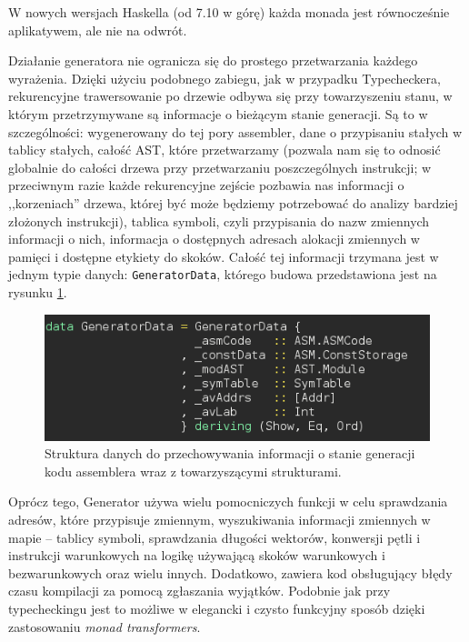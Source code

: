 W nowych wersjach Haskella (od 7.10 w górę) każda monada jest równocześnie aplikatywem, ale nie na odwrót.

Działanie generatora nie ogranicza się do prostego przetwarzania każdego wyrażenia. Dzięki użyciu podobnego zabiegu, jak w przypadku Typecheckera, rekurencyjne trawersowanie po drzewie odbywa się przy towarzyszeniu stanu, w którym przetrzymywane są informacje o bieżącym stanie generacji. Są to w szczególności: wygenerowany do tej pory assembler, dane o przypisaniu stałych w tablicy stałych, całość AST, które przetwarzamy (pozwala nam się to odnosić globalnie do całości drzewa przy przetwarzaniu poszczególnych instrukcji; w przeciwnym razie każde rekurencyjne zejście pozbawia nas informacji o ,,korzeniach'' drzewa, której być może będziemy potrzebować do analizy bardziej złożonych instrukcji), tablica symboli, czyli przypisania do nazw zmiennych informacji o nich, informacja o dostępnych adresach alokacji zmiennych w pamięci i dostępne etykiety do skoków. Całość tej informacji trzymana jest w jednym typie danych: \texttt{GeneratorData}, którego budowa przedstawiona jest na rysunku \ref{fig:generator-data}.

\begin{figure}
  \begin{center}
    \includegraphics[scale=0.5]{images/generator-data.png}
    \caption{Struktura danych do przechowywania informacji o stanie generacji kodu assemblera wraz z towarzyszącymi strukturami.}
    \label{fig:generator-data}
  \end{center}
\end{figure}

Oprócz tego, Generator używa wielu pomocniczych funkcji w celu sprawdzania adresów, które przypisuje zmiennym, wyszukiwania informacji zmiennych w mapie -- tablicy symboli, sprawdzania długości wektorów, konwersji pętli i instrukcji warunkowych na logikę używającą skoków warunkowych i bezwarunkowych oraz wielu innych. Dodatkowo, zawiera kod obsługujący błędy czasu kompilacji za pomocą zgłaszania wyjątków. Podobnie jak przy typecheckingu jest to możliwe w elegancki i czysto funkcyjny sposób dzięki zastosowaniu \textit{monad transformers}.


